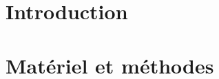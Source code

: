 \documentclass[10pt,twocolumn,titlepage,twoside]{article}\usepackage[]{graphicx}\usepackage[]{color}
\begin{document}


\newpage
\renewcommand{\contentsname}{Sommaire:}
\tableofcontents



\bigskip

\section*{Introduction}
\label{Introduction}
\section{Matériel et méthodes}
\end{document}
